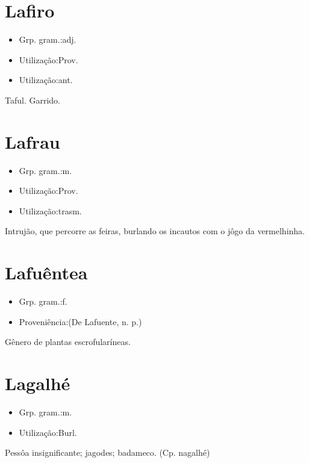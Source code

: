 \section{Lafiro}
\begin{itemize}
\item {Grp. gram.:adj.}
\end{itemize}
\begin{itemize}
\item {Utilização:Prov.}
\end{itemize}
\begin{itemize}
\item {Utilização:ant.}
\end{itemize}
Taful.
Garrido.
\section{Lafrau}
\begin{itemize}
\item {Grp. gram.:m.}
\end{itemize}
\begin{itemize}
\item {Utilização:Prov.}
\end{itemize}
\begin{itemize}
\item {Utilização:trasm.}
\end{itemize}
Intrujão, que percorre as feiras, burlando os incautos com o jôgo da vermelhinha.
\section{Lafuêntea}
\begin{itemize}
\item {Grp. gram.:f.}
\end{itemize}
\begin{itemize}
\item {Proveniência:(De \textunderscore Lafuente\textunderscore , n. p.)}
\end{itemize}
Gênero de plantas escrofularíneas.
\section{Lagalhé}
\begin{itemize}
\item {Grp. gram.:m.}
\end{itemize}
\begin{itemize}
\item {Utilização:Burl.}
\end{itemize}
Pessôa insignificante; jagodes; badameco.
(Cp. \textunderscore nagalhé\textunderscore )
